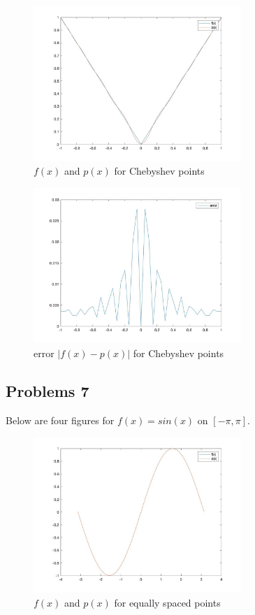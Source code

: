 \documentclass[11pt,fleqn]{exam}
\begin{document}
\begin{figure}[H]
  	\centering
  	\includegraphics[width=0.7\textwidth]{q6_c_1}
  	\caption{$f(x)$ and $p(x)$ for Chebyshev points}
\end{figure}

\begin{figure}[H]
  	\centering
  	\includegraphics[width=0.7\textwidth]{q6_c_2}
  	\caption{error $|f(x) - p(x)|$ for Chebyshev points}
\end{figure}

\newpage
\subsection*{Problems 7}
Below are four figures for $f(x) = sin(x)$ on $[-\pi,\pi]$.
\begin{figure}[H]
  	\centering
  	\includegraphics[width=0.7\textwidth]{q7_a}
  	\caption{$f(x)$ and $p(x)$ for equally spaced points}
\end{figure}
\end{document}
